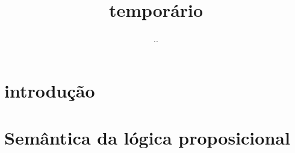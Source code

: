 \documentclass{article}
\title{temporário}
\author{..}
\begin{document}
\maketitle

\section{introdução}

\section{Semântica da lógica proposicional}
\end{document}
